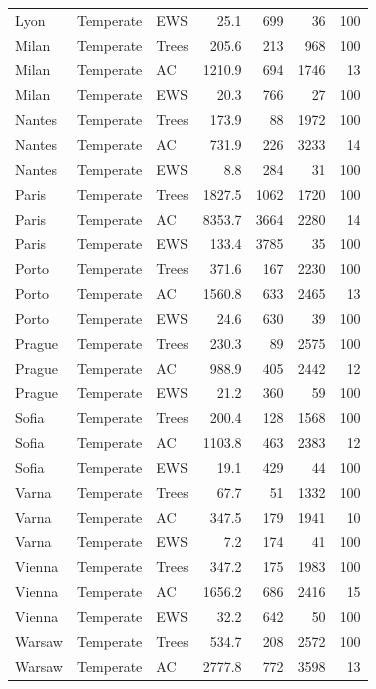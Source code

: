 \begin{table}[ht]
\begin{tabular}{lllrrrr}
  Lyon & Temperate & EWS & 25.1 & 699 & 36 & 100 \\ 
  Milan & Temperate & Trees & 205.6 & 213 & 968 & 100 \\ 
  Milan & Temperate & AC & 1210.9 & 694 & 1746 & 13 \\ 
  Milan & Temperate & EWS & 20.3 & 766 & 27 & 100 \\ 
  Nantes & Temperate & Trees & 173.9 & 88 & 1972 & 100 \\ 
  Nantes & Temperate & AC & 731.9 & 226 & 3233 & 14 \\ 
  Nantes & Temperate & EWS & 8.8 & 284 & 31 & 100 \\ 
  Paris & Temperate & Trees & 1827.5 & 1062 & 1720 & 100 \\ 
  Paris & Temperate & AC & 8353.7 & 3664 & 2280 & 14 \\ 
  Paris & Temperate & EWS & 133.4 & 3785 & 35 & 100 \\ 
  Porto & Temperate & Trees & 371.6 & 167 & 2230 & 100 \\ 
  Porto & Temperate & AC & 1560.8 & 633 & 2465 & 13 \\ 
  Porto & Temperate & EWS & 24.6 & 630 & 39 & 100 \\ 
  Prague & Temperate & Trees & 230.3 & 89 & 2575 & 100 \\ 
  Prague & Temperate & AC & 988.9 & 405 & 2442 & 12 \\ 
  Prague & Temperate & EWS & 21.2 & 360 & 59 & 100 \\ 
  Sofia & Temperate & Trees & 200.4 & 128 & 1568 & 100 \\ 
  Sofia & Temperate & AC & 1103.8 & 463 & 2383 & 12 \\ 
  Sofia & Temperate & EWS & 19.1 & 429 & 44 & 100 \\ 
  Varna & Temperate & Trees & 67.7 & 51 & 1332 & 100 \\ 
  Varna & Temperate & AC & 347.5 & 179 & 1941 & 10 \\ 
  Varna & Temperate & EWS & 7.2 & 174 & 41 & 100 \\ 
  Vienna & Temperate & Trees & 347.2 & 175 & 1983 & 100 \\ 
  Vienna & Temperate & AC & 1656.2 & 686 & 2416 & 15 \\ 
  Vienna & Temperate & EWS & 32.2 & 642 & 50 & 100 \\ 
  Warsaw & Temperate & Trees & 534.7 & 208 & 2572 & 100 \\ 
  Warsaw & Temperate & AC & 2777.8 & 772 & 3598 & 13 \\ 

\end{tabular}
\end{table}
